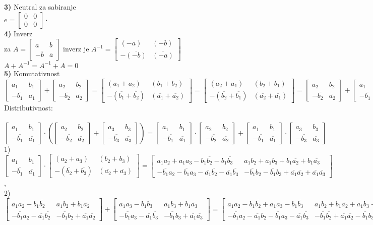\documentclass[11pt]{article}
\newcommand\eng{\fontencoding{OT1}\fontfamily{\rmdefault}\selectfont}
\newcommand{\bm}{\begin{bmatrix}}
\newcommand{\enm}{\end{bmatrix}}
\newcommand{\ov}{\overline}
\begin{document}
\large \textbf{3)} Neutral za sabiranje\\
$e=\bm 0&0\\0&0\enm\cdot$\\
\textbf{4)} Inverz\\
za $A=\bm a&b\\-\ov{b}&\ov{a}\enm$ inverz je $A^{-1}=\bm (-a)&(-b)\\-\ov{(-b)}&\ov{(-a)}\enm$\\
$A+A^{-1}=A^{-1}+A=0$\\
\textbf{5)} Komutativnost\\
$\bm a_1&b_1\\-\ov{b_1}&\ov{a_1}\enm + \bm a_2&b_2\\-\ov{b_2}&\ov{a_2}\enm = \bm (a_1+a_2)&(b_1+b_2)\\-(\ov{b_1}+\ov{b_2})&(\ov{a_1}+\ov{a_2})\enm=\bm (a_2+a_1)&(b_2+b_1)\\-(\ov{b_2}+\ov{b_1})&(\ov{a_2}+\ov{a_1})\enm = \bm a_2&b_2\\-\ov{b_2}&\ov{a_2}\enm+\bm a_1&b_1\\-\ov{b_1}&\ov{a_1}\enm $\\

\textbf{\eng{II}} Distributivnost:\\\\
$\bm a_1&b_1\\-\ov{b_1}&\ov{a_1}\enm \cdot \left(\bm a_2&b_2\\-\ov{b_2}&\ov{a_2}\enm + \bm a_3&b_3\\-\ov{b_3}&\ov{a_3}\enm\right)=\bm a_1&b_1\\-\ov{b_1}&\ov{a_1}\enm \cdot \bm a_2&b_2\\-\ov{b_2}&\ov{a_2}\enm +\bm a_1&b_1\\-\ov{b_1}&\ov{a_1}\enm \cdot \bm a_3&b_3\\-\ov{b_3}&\ov{a_3}\enm$\\
1)\\ 
$\bm a_1&b_1\\-\ov{b_1}&\ov{a_1}\enm \cdot \bm (a_2+a_3)&(b_2+b_3)\\-(\ov{b_2}+\ov{b_3})&(\ov{a_2}+\ov{a_3})\enm = \bm  a_1a_2+a_1a_3-b_1\ov{b_2}-b_1\ov{b_3}&a_1b_2+a_1b_3+b_1\ov{a_2}+b_1\ov{a_3}\\ -\ov{b_1}a_2-\ov{b_1}a_3-\ov{a_1}\ov{b_2}-\ov{a_1}\ov{b_3}&-\ov{b_1}b_2-\ov{b_1}b_3+\ov{a_1}\ov{a_2}+\ov{a_1}\ov{a_3} \enm$,\\
2)\\
\small $\bm a_1a_2-b_1\ov{b_2}&a_1b_2+b_1\ov{a_2}\\ -\ov{b_1}a_2-\ov{a_1}\ov{b_2}&-\ov{b_1}b_2+\ov{a_1}\ov{a_2} \enm + \bm a_1a_3-b_1\ov{b_3}&a_1b_3+b_1\ov{a_3}\\ -\ov{b_1}a_3-\ov{a_1}\ov{b_3}&-\ov{b_1}b_3+\ov{a_1}\ov{a_3} \enm = \bm  a_1a_2-b_1\ov{b_2}+a_1a_3-b_1\ov{b_3}&a_1b_2+b_1\ov{a_2}+a_1b_3+b_1\ov{a_3}\\ -\ov{b_1}a_2-\ov{a_1}b_2-\ov{b_1}a_3-\ov{a_1}\ov{b_3}&-\ov{b_1}\ov{b_2}+\ov{a_1}\ov{a_2}-\ov{b_1}b_3+\ov{a_1}\ov{a_3} \enm\cdot$\\
\end{document}
